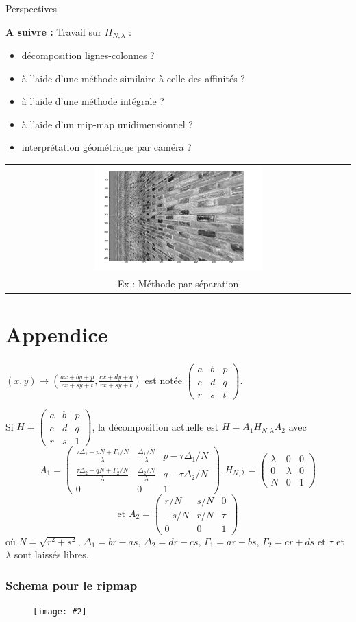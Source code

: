 \documentclass[c,12pt]{beamer}
\newcommand{\image}[2]{\begin{figure} \texttt{[image: \#2]}\end{figure}}
\newcommand{\matrice}[1]{\left(\begin{matrix} #1 \end{matrix}\right)}
\newcommand{\fram}[2]{\begin{frame} \frametitle{#1} #2 \end{frame}}
\begin{document}
\begin{frame}{Perspectives}

\textbf{A suivre :} Travail sur $H_{N,\lambda}$ :\\
	\begin{itemize}
                \item décomposition lignes-colonnes ?
                \item à l'aide d'une méthode similaire à celle des affinités ?
                \item à l'aide d'une méthode intégrale ?
                \item à l'aide d'un mip-map unidimensionnel ? 
                \item interprétation géométrique par caméra ?
                \end{itemize}
\begin{tabular}{c}
		\includegraphics[width=0.5\textwidth]{murhomographie.jpg}\\
                       {\small Ex : Méthode par séparation}
	\end{tabular}
\end{frame}






  \appendix
  \section{Appendice}
\fram{}{  $(x,y)\mapsto \left(\frac{ax+by+p}{rx+sy+t},\frac{cx+dy+q}{rx+sy+t}\right)$ est notée $\matrice{a&b&p\\c&d&q\\r&s&t}$. %
   
   Si $H = \matrice{a&b&p\\c&d&q\\r&s&1}$, la décomposition actuelle est $H=A_1H_{N,\lambda}A_2$ avec
   \[A_1 = \matrice{\frac{\tau\Delta_1-pN+\Gamma_1/N}{\lambda} & \frac{\Delta_1/N}{\lambda} & p-\tau\Delta_1/N\\ \frac{\tau\Delta_2-qN+\Gamma_2/N}{\lambda} & \frac{\Delta_2/N}{\lambda} & q-\tau\Delta_2/N\\ 0 & 0 & 1}, H_{N,\lambda} = \matrice{\lambda & 0 & 0\\0 & \lambda & 0\\N & 0 & 1} \]
   \[\text{et }A_2 = \matrice{r/N & s/N & 0\\-s/N & r/N & \tau\\0 & 0 & 1}\]
   où $N=\sqrt{r^2+s^2}$, $\Delta_1=br-as$, $\Delta_2=dr-cs$, $\Gamma_1 = ar+bs$, $\Gamma_2 = cr+ds$ et $\tau$ et $\lambda$ sont laissés libres.
   
   
  }
 
 \fram{Schema pour le ripmap}{\image{0.5}{pbripmap}}
 
\end{document}
